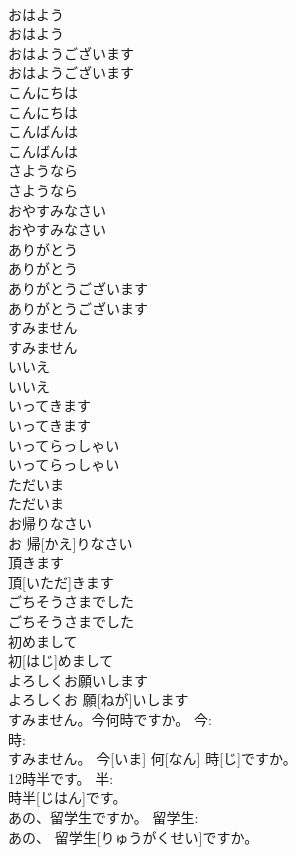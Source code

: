 \documentclass[8pt]{extreport}
\begin{document}
\begin{CJK}{UTF8}{min}
\\	おはよう	
\\	おはよう		
\\	おはようございます	
\\	おはようございます		
\\	こんにちは	
\\	こんにちは		
\\	こんばんは	
\\	こんばんは		
\\	さようなら	
\\	さようなら		
\\	おやすみなさい	
\\	おやすみなさい		
\\	ありがとう	
\\	ありがとう		
\\	ありがとうございます	
\\	ありがとうございます		
\\	すみません	
\\	すみません		
\\	いいえ	
\\	いいえ		
\\	いってきます	
\\	いってきます		
\\	いってらっしゃい	
\\	いってらっしゃい		
\\	ただいま	
\\	ただいま		
\\	お帰りなさい	
\\	お 帰[かえ]りなさい		
\\	頂きます	
\\	頂[いただ]きます		
\\	ごちそうさまでした	
\\	ごちそうさまでした		
\\	初めまして	
\\	初[はじ]めまして		
\\	よろしくお願いします	
\\	よろしくお 願[ねが]いします		
\\	すみません。今何時ですか。	今: 
\\	時: 
\\	すみません。 今[いま] 何[なん] 時[じ]ですか。	
\\	12時半です。	半: 
\\	時半[じはん]です。	
\\	あの、留学生ですか。	留学生: 
\\	あの、 留学生[りゅうがくせい]ですか。		

\end{CJK}
\end{document}
